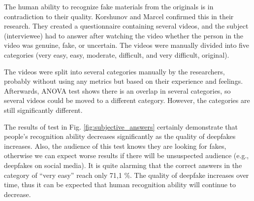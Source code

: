 The human ability to recognize fake materials from the originals is in contradiction to their quality. Korshunov and Marcel \cite{TheThreatOfDeepfakes} confirmed this in their research. They created a questionnaire containing several videos, and the subject (interviewee) had to answer after watching the video whether the person in the video was genuine, fake, or uncertain. The videos were manually divided into five categories (very easy, easy, moderate, difficult, and very difficult, original). 

The videos were split into several categories manually by the researchers, probably without using any metrics but based on their experience and feelings. Afterwards, ANOVA test shows there is an overlap in several categories, so several videos could be moved to a different category. However, the categories are still significantly different.

The results of test in Fig. \ref{fig:subjective_answers} certainly demonstrate that people's recognition ability decreases significantly as the quality of deepfakes increases. Also, the audience of this test knows they are looking for fakes, otherwise we can expect worse results if there will be unsuspected audience (e.g., deepfakes on social media). It is quite alarming that the correct answers in the category of “very easy” reach only 71,1 \%. The quality of deepfake increases over time, thus it can be expected that human recognition ability will continue to decrease. \cite{TheThreatOfDeepfakes}

